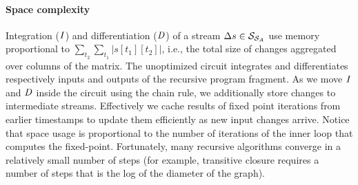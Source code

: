 \paragraph{Space complexity} Integration ($\mathit{I}$) and differentiation ($\mathit{D}$) of a
stream $\Delta s \in \mathcal{S}_{\mathcal{S}_{A}}$ use memory proportional to
$\sum_{t_2}\sum_{t_1}|s[t_1][t_2]|$, i.e., the total size of changes
aggregated over columns of the matrix.  The unoptimized circuit
integrates and differentiates respectively inputs and outputs of the
recursive program fragment.  As we move $\mathit{I}$ and $\mathit{D}$ inside the
circuit using the chain rule, we additionally store changes to
intermediate streams.  Effectively we cache results of fixed point
iterations from earlier timestamps to update them efficiently as new
input changes arrive.  Notice that space usage is proportional to the
number of iterations of the inner loop that computes the fixed-point.
Fortunately, many recursive algorithms converge in a relatively small
number of steps (for example, transitive closure requires a number of
steps that is the log of the diameter of the graph).
